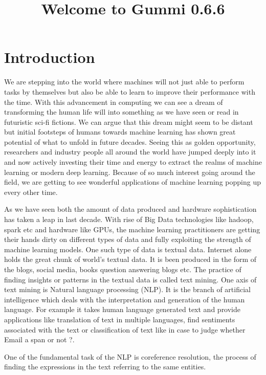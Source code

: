 \documentclass[11pt]{article}
\title{\textbf{Welcome to Gummi 0.6.6}}
\begin{document}
\maketitle



\section{Introduction}
We are stepping into the world where machines will not just able to perform tasks by themselves but also be able to learn to improve their performance with the time. With this advancement in computing we can see a dream of transforming the human life will into something as we have seen or read  in futuristic sci-fi fictions. We can argue that this dream might seem to be distant but initial footsteps of humans towards machine learning has shown great potential of what to unfold in future decades. Seeing this as golden opportunity, researchers and industry people all around the world have jumped  deeply into it and now actively investing their time and energy to extract the realms of machine learning or modern deep learning. Because of so much interest going around the field, we are getting to see wonderful applications of machine learning popping up every other time.

As we have seen both the amount of data produced and hardware sophistication has taken a leap in last decade. With rise of Big Data technologies like hadoop, spark etc and hardware like GPUs, the machine learning practitioners are getting their hands dirty on different types of data and fully exploiting the strength of machine learning models. One such type of data is textual data. Internet alone holds the great chunk of world's textual data. It is been produced in the form of the blogs, social media, books question answering blogs etc. The practice of finding insights or patterns in the textual data is called text mining.  One axis of  text mining is Natural language processing (NLP). It is the branch of artificial intelligence which deals with the interpretation and generation of the human language. For example it takes human language  generated  text and provide applications like translation of text in multiple languages, find sentiments  associated with the text or classification of text like in case  to judge whether Email  a span or not ?.

One of the fundamental task of the NLP is coreference resolution, the process of finding the expressions in the text referring to the same entities. 
\end{document}
